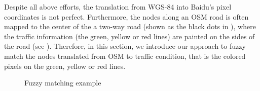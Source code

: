 %
%


Despite all above efforts, the translation
from WGS-84 into Baidu's pixel coordinates is not perfect. 
Furthermore, the nodes along an OSM road is often mapped to the
center of the a two-way road (shown as the black dots in
), where the traffic information (the
green, yellow or red lines) are painted on the sides of the road
(see ).
Therefore, in this section, we introduce our approach to fuzzy match
the nodes translated from OSM to traffic condition, that is the colored
pixels on the green, yellow or red lines.

\begin{figure}[th]
	\centering
	\caption{Fuzzy matching example}
	\label{fig:range}
\end{figure}


